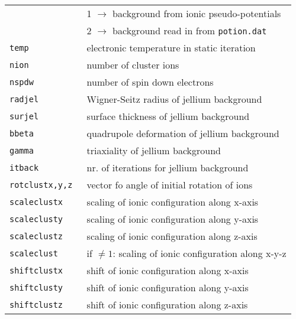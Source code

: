 \documentclass[12pt]{article}
\begin{document}
\begin{tabular}{ll}
                       &  1 $\rightarrow$ background from ionic pseudo-potentials\\
                       &  2 $\rightarrow$ background read in from {\tt potion.dat}\\
{\tt temp} &  electronic temperature in static iteration \\
{\tt nion             }& number of cluster ions\\
{\tt nspdw            }& number of spin down electrons \\
{\tt radjel           }& Wigner-Seitz radius of jellium background\\
{\tt surjel         }& surface thickness of jellium background\\
{\tt bbeta         }& quadrupole deformation of jellium background\\
{\tt gamma         }& triaxiality of jellium background\\
{\tt itback} &  nr. of iterations for jellium background \\
{\tt rotclustx,y,z } & vector fo angle of initial rotation of ions\\
{\tt scaleclustx} & scaling of ionic configuration along x-axis  \\
{\tt scaleclusty} & scaling of ionic configuration along y-axis   \\
{\tt scaleclustz} & scaling of ionic configuration along z-axis   \\
{\tt scaleclust} & if $\neq 1$: scaling of ionic configuration along x-y-z  \\
{\tt shiftclustx} & shift of ionic configuration along x-axis  \\
{\tt shiftclusty} & shift of ionic configuration along y-axis  \\
{\tt shiftclustz} & shift of ionic configuration along z-axis  \\
\hline
\end{tabular}
\end{document}
